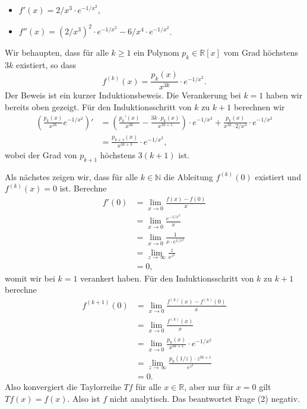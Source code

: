 \documentclass[../main.tex]{subfiles}
\begin{document}
\begin{examples}
\begin{enumerate}[(1)]
      \begin{itemize}
        \item $f'(x) = 2/x^3 \cdot e^{-1/x^2}$,
        \item $f''(x) = {(2/x^3)}^2 \cdot e^{-1/x^2} - 6/x^4 \cdot e^{- 1/x^2}$.
      \end{itemize}
      Wir behaupten, dass für alle $k \geq 1$ ein Polynom $p_k \in \mathbb{R}[x]$ 
      vom Grad höchstens $3k$ existiert,
      so dass
      \[
        f^{(k)}(x) = \frac{p_k(x)}{x^{3k}} \cdot e^{-1/x^2}.
      \]
      Der Beweis ist ein kurzer Induktionsbeweis. Die Verankerung bei $k = 1$ 
      haben wir bereits oben gezeigt. Für den Induktionsschritt von $k$ zu
      $k + 1$ berechnen wir
      \begin{align*}
         \left( \frac{p_k(x)}{x^{3k}} e^{-1/x^2}\right)'
         &= \left( \frac{p_k'(x)}{x^{3k}} - \frac{3k \cdot p_k(x)}{x^{3k+1}} \right)
         \cdot e^{-1/x^2}
         + \frac{p_k(x)}{x^{3k} \cdot 2/x^3} \cdot e^{-1/x^2}\\
         &= \frac{p_{k+1}(x)}{x^{3k+3}} \cdot e^{-1/x^2},
      \end{align*}
      wobei der Grad von $p_{k+1}$ höchstens $3(k+1)$ ist.

      Als nächstes zeigen wir, dass für alle $k \in \mathbb{N}$ die Ableitung
      $f^{(k)}(0)$ existiert und $f^{(k)}(x) = 0$ ist.
      Berechne
      \begin{align*}
        f'(0)
        & = \lim_{x \to 0} \frac{f(x) - f(0)}{x}\\
        & = \lim_{x \to 0} \frac{e^{-1/x^2}}{x}\\
        & = \lim_{x \to 0} \frac{1}{x \cdot e^{1/x^2}} \\
        & = \lim_{z \to \infty} \frac{z}{e^{z^2}} \\
        & = 0,
      \end{align*}
      womit wir bei $k = 1$ verankert haben.
      Für den Induktionsschritt von $k$ zu $k + 1$ berechne
      \begin{align*}
        f^{(k+1)}(0)
        & = \lim_{x \to 0} \frac{f^{(k)}(x) - f^{(k)}(0)}{x}\\
        & = \lim_{x \to 0} \frac{f^{(k)}(x)}{x}\\
        & = \lim_{x \to 0} \frac{p_k(x)}{x^{3k+1}} \cdot e^{-1/x^2}\\
        & = \lim_{z \to \infty} \frac{p_k(1/z) \cdot z^{3k+1}}{e^{z^2}} \\
        & = 0.
      \end{align*}
      Also konvergiert die Taylorreihe $Tf$ für alle $x \in \mathbb{R}$,
      aber nur für $x = 0$ gilt $Tf(x) = f(x)$.
      Also ist $f$ nicht analytisch.
      Das beantwortet Frage (2) negativ.


\end{enumerate}
\end{examples}
\end{document}
